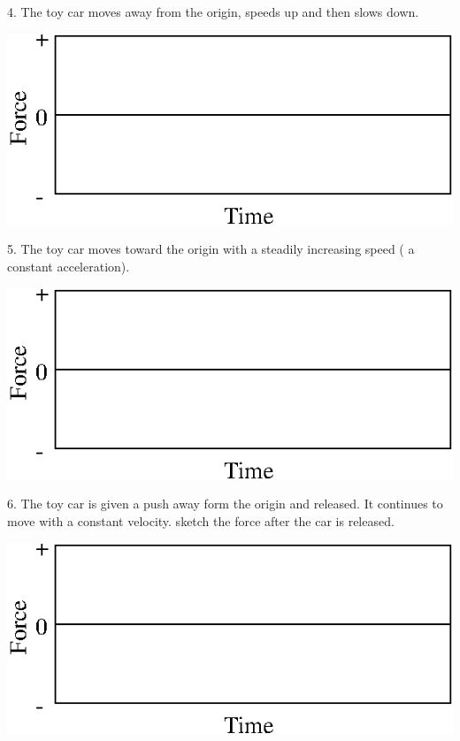 4. The toy car moves away from the origin, speeds up and then slows down.

\vspace{0.3cm}
{\par\centering \includegraphics{force2_fig7.eps} \par}
\vspace{0.3cm}

5. The toy car moves toward the origin with a steadily increasing speed ( a
constant acceleration).

\vspace{0.3cm}
{\par\centering \includegraphics{force2_fig7.eps} \par}
\vspace{0.3cm}

6. The toy car is given a push away form the origin and released. It continues
to move with a constant velocity. sketch the force after the car is released.

\vspace{0.3cm}
{\par\centering \includegraphics{force2_fig7.eps} \par}
\vspace{1.3cm}


